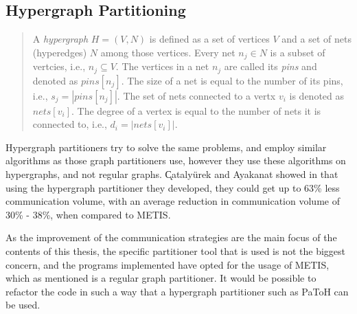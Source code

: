 \subsection{Hypergraph Partitioning}
\begin{quote}
    A \emph{hypergraph} \(H = (V,N)\) is defined as a set of vertices \(V\) and a set of nets (hyperedges) \(N\) among those vertices. Every net \(n_{j} \in N\) is a subset of vertcies, i.e., \(n_{j} \subseteq V\). The vertices in a net \(n_{j}\) are called its \textit{pins} and denoted as \(pins[n_{j}]\). The size of a net is equal to the number of its pins, i.e., \(s_{j} = \left|  pins[n_{j}] \right|\). The set of nets connected to a vertx \(v_{i}\) is denoted as \(nets[v_{i}]\). The degree of a vertex is equal to the number of nets it is connected to, i.e., \(d_{i} = \left| nets[v_{i}] \right|\).
\end{quote}

\begin{flushright}
    \cite{hypergraphpartitioning}
\end{flushright}
\medskip
Hypergraph partitioners try to solve the same problems, and employ similar algorithms as those graph partitioners use, however they use these algorithms on hypergraphs, and not regular graphs. \k Cataly\" urek and Ayakanat showed in \cite{hypergraphpartitioning} that using the hypergraph partitioner they developed, they could get up to 63\% less communication volume, with an average reduction in communication volume of 30\% - 38\%, when compared to METIS.
\medskip

As the improvement of the communication strategies are the main focus of the contents of this thesis, the specific partitioner tool that is used is not the biggest concern, and the programs implemented have opted for the usage of METIS, which as mentioned is a regular graph partitioner. It would be possible to refactor the code in such a way that a hypergraph partitioner such as PaToH can be used.



